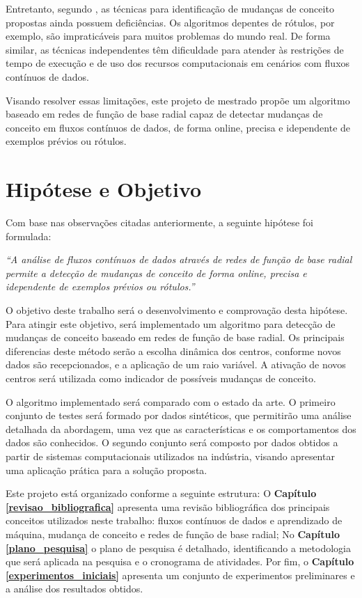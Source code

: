 \documentclass[qual, classic, a4paper]{ufbathesis}
\begin{document}
Entretanto, segundo \cite{Aggarwal:2006:DSM:1196418, Gama:2014:SCD:2597757.2523813}, as técnicas para identificação de mudanças de conceito propostas ainda possuem deficiências.
Os algoritmos depentes de rótulos, por exemplo, são impraticáveis para muitos problemas do mundo real.
De forma similar, as técnicas independentes têm dificuldade para atender às restrições de tempo de execução e de uso dos recursos computacionais em cenários com fluxos contínuos de dados.

Visando resolver essas limitações, este projeto de mestrado propõe um algoritmo baseado em redes de função de base radial capaz de detectar mudanças de conceito em fluxos contínuos de dados, de forma online, precisa e idependente de exemplos prévios ou rótulos.

\section{Hipótese e Objetivo}

Com base nas observações citadas anteriormente, a seguinte hipótese foi formulada:

\begin{center}
\textit{``A análise de fluxos contínuos de dados através de redes de função de base radial permite a detecção de mudanças de conceito de forma online, precisa e idependente de exemplos prévios ou rótulos.''}
\end{center}

O objetivo deste trabalho será o desenvolvimento e comprovação desta hipótese.
Para atingir este objetivo, será implementado um algoritmo para detecção de mudanças de conceito baseado em redes de função de base radial. 
Os principais diferencias deste método serão a escolha dinâmica dos centros, conforme novos dados são recepcionados, e a aplicação de um raio variável.
A ativação de novos centros será utilizada como indicador de possíveis mudanças de conceito.

O algoritmo implementado será comparado com o estado da arte. 
O primeiro conjunto de testes será formado por dados sintéticos, que permitirão uma análise detalhada da abordagem, uma vez que as características e os comportamentos dos dados são conhecidos. 
O segundo conjunto será composto por dados obtidos a partir de sistemas computacionais utilizados na indústria,
visando apresentar uma aplicação prática para a solução proposta. 

Este projeto está organizado conforme a seguinte estrutura: 
O \textbf{Capítulo \ref{revisao_bibliografica}} apresenta uma revisão bibliográfica dos principais conceitos utilizados neste trabalho: fluxos contínuos de dados e aprendizado de máquina, mudança de conceito e redes de função de base radial; 
No \textbf{Capítulo \ref{plano_pesquisa}} o plano de pesquisa é detalhado, 
identificando a metodologia que será aplicada na pesquisa e o cronograma de atividades. 
Por fim, o \textbf{Capítulo \ref{experimentos_iniciais}} 
apresenta um conjunto de experimentos preliminares e a análise dos resultados obtidos.
\end{document}
